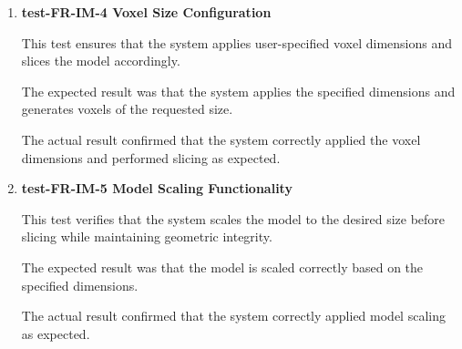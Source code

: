 \documentclass[12pt, titlepage]{article}
\begin{document}
\begin{enumerate}

\item \textbf{test-FR-IM-4 Voxel Size Configuration}

\hspace{1.5em} This test ensures that the system applies user-specified voxel dimensions and slices the model accordingly.

The expected result was that the system applies the specified dimensions and generates voxels of the requested size.

The actual result confirmed that the system correctly applied the voxel dimensions and performed slicing as expected.




\item \textbf{test-FR-IM-5 Model Scaling Functionality}

\hspace{1.5em} This test verifies that the system scales the model to the desired size before slicing while maintaining geometric integrity.

The expected result was that the model is scaled correctly based on the specified dimensions.

The actual result confirmed that the system correctly applied model scaling as expected.



\end{enumerate}
\end{document}
